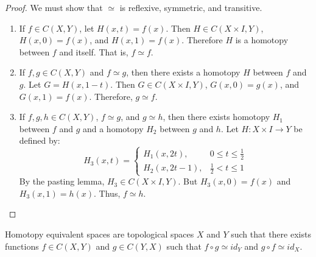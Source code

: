 \documentclass[crop=false,class=article,oneside]{standalone}
\begin{document}
        \begin{proof}
            We must show that $\simeq$ is reflexive,
            symmetric, and transitive.
            \begin{enumerate}
                \item If ${f}\in{C(X,Y)}$,
                    let $H(x,t)=f(x)$. Then
                    $H\in{C({X}\times{I},Y)}$, $H(x,0)=f(x)$,
                    and $H(x,1)=f(x)$.
                    Therefore $H$ is a homotopy between $f$ and
                    itself. That is, $f\simeq f$.
                \item If ${f,g}\in{C(X,Y)}$ and ${f}\simeq{g}$,
                    then there exists a homotopy $H$
                    between $f$ and $g$.
                    Let $G=H(x,1-t)$. Then
                    $G\in{C({X}\times{I},Y)}$,
                    $G(x,0)=g(x)$, and $G(x,1)=f(x)$.
                    Therefore, ${g}\simeq{f}$.
                \item If ${f,g,h}\in{C(X,Y)}$, ${f}\simeq{g}$,
                    and ${g}\simeq{h}$, then there exists
                    homotopy $H_{1}$ between $f$ and $g$ and
                    a homotopy $H_{2}$ between $g$ and $h$.
                    Let $H:{X}\times{I}\rightarrow{Y}$
                    be defined by:
                    \begin{equation*}
                        H_{3}(x,t)=
                        \begin{cases}
                            H_{1}(x,2t),
                            &{0}\leq{t}\leq\frac{1}{2}\\
                            H_{2}(x,2t-1),
                            &\frac{1}{2}<{t}\leq{1}
                        \end{cases}
                    \end{equation*}
                    By the pasting lemma, 
                    $H_{3}\in{C({X}\times{I},Y)}$.
                    But $H_{3}(x,0)=f(x)$ and
                    $H_{3}(x,1)=h(x)$.
                    Thus, $f\simeq h$.
            \end{enumerate}
        \end{proof}
        \clearpage
        \begin{definition}
            Homotopy equivalent spaces are topological
            spaces $X$ and $Y$ such that there exists functions
            ${f}\in{C(X,Y)}$ and ${g}\in{C(Y,X)}$
            such that
            ${f}\circ{g}\simeq{id_{Y}}$
            and ${g}\circ{f}\simeq{id_{X}}$.
        \end{definition}
\end{document}
